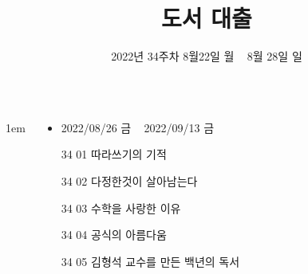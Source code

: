 \documentclass[	20pt, 
							a1paper, 
							portrait, %
							margin=0mm, %
							innermargin=10mm,  		%
							colspace=5mm, 
							subcolspace=0mm
							]{tikzposter}
\title{도서 대출}
\author{ 2022년 34주차 8월22일 월 ~ 8월 28일 일  }
\begin{document}
	\maketitle

	\begin{columns}


			{
					\setlength{\leftmargini}{4em}
					\setlength{\labelsep} {1em}
				\begin{LARGE}

					\begin{itemize}
					\item 	2022/08/26 금 ~ 2022/09/13 금
					\item 	[34 01] 따라쓰기의 기적
					\item 	[34 02] 다정한것이 살아남는다
					\item 	[34 03] 수학을 사랑한 이유
					\item 	[34 04] 공식의 아름다움
					\item 	[34 05] 김형석 교수를 만든 백년의 독서
					\end{itemize}
				\end{LARGE}
			}










\end{columns}
\end{document}
